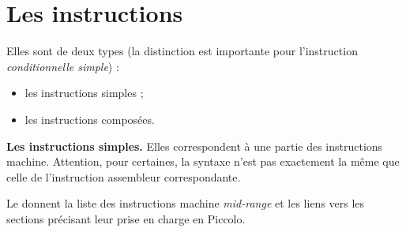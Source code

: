 \section{Les instructions}

Elles sont de deux types (la distinction est importante pour l’instruction \emph{conditionnelle simple}) :
\begin{itemize}
  \item les instructions simples ;
  \item les instructions composées.

\end{itemize}


\textbf{Les instructions simples.} Elles correspondent à une partie des instructions machine. Attention, pour certaines, la syntaxe n'est pas exactement la même que celle de l'instruction assembleur correspondante.

Le  donnent la liste des instructions machine \emph{mid-range} et les liens vers les sections précisant leur prise en charge en Piccolo.

